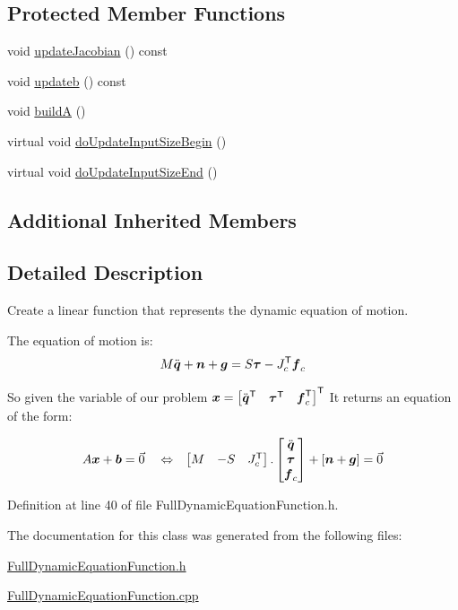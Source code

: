 \subsection*{Protected Member Functions}
\begin{DoxyCompactItemize}
\item 
void \hyperlink{group__constraint_ga5b4ea2e9706cd848923c835e2df0eff5}{update\+Jacobian} () const
\item 
void \hyperlink{group__constraint_gafab74164b55cd66d2b132915774b59f0}{updateb} () const
\item 
void \hyperlink{group__constraint_ga19d9bbe4f78b4c396930388a70b8cd4b}{buildA} ()
\item 
virtual void \hyperlink{group__constraint_gadbdce52af8ba057e93ea923db5a3ce04}{do\+Update\+Input\+Size\+Begin} ()
\item 
virtual void \hyperlink{group__constraint_ga8c14a0ff3f87c32d030a3a1753b7a77e}{do\+Update\+Input\+Size\+End} ()
\end{DoxyCompactItemize}
\subsection*{Additional Inherited Members}


\subsection{Detailed Description}
Create a linear function that represents the dynamic equation of motion. 

The equation of motion is\+: \[ M \ddot{\mbox{\boldmath${q}$}} + \mbox{\boldmath${n}$} + \mbox{\boldmath${g}$} = S \mbox{\boldmath${\tau}$} - J_c^{\mathsf{T}} \mbox{\boldmath${f}$}_c \]

So given the variable of our problem $ \mbox{\boldmath${x}$} = \begin{bmatrix} \ddot{\mbox{\boldmath${q}$}}^{\mathsf{T}} & \mbox{\boldmath${\tau}$}^{\mathsf{T}} & \mbox{\boldmath${f}$}_c^{\mathsf{T}}\end{bmatrix}^{\mathsf{T}} $ It returns an equation of the form\+:

\begin{align*} A \mbox{\boldmath${x}$} + \mbox{\boldmath${b}$} &= \vec{0} & &\Leftrightarrow & \begin{bmatrix} M & -S & J_c^{\mathsf{T}} \end{bmatrix} . \begin{bmatrix} \ddot{\mbox{\boldmath${q}$}} \\ \mbox{\boldmath${\tau}$} \\ \mbox{\boldmath${f}$}_c\end{bmatrix} + [ \mbox{\boldmath${n}$} + \mbox{\boldmath${g}$} ] = \vec{0} \end{align*} 

Definition at line 40 of file Full\+Dynamic\+Equation\+Function.\+h.



The documentation for this class was generated from the following files\+:\begin{DoxyCompactItemize}
\item 
\hyperlink{FullDynamicEquationFunction_8h}{Full\+Dynamic\+Equation\+Function.\+h}\item 
\hyperlink{FullDynamicEquationFunction_8cpp}{Full\+Dynamic\+Equation\+Function.\+cpp}\end{DoxyCompactItemize}
